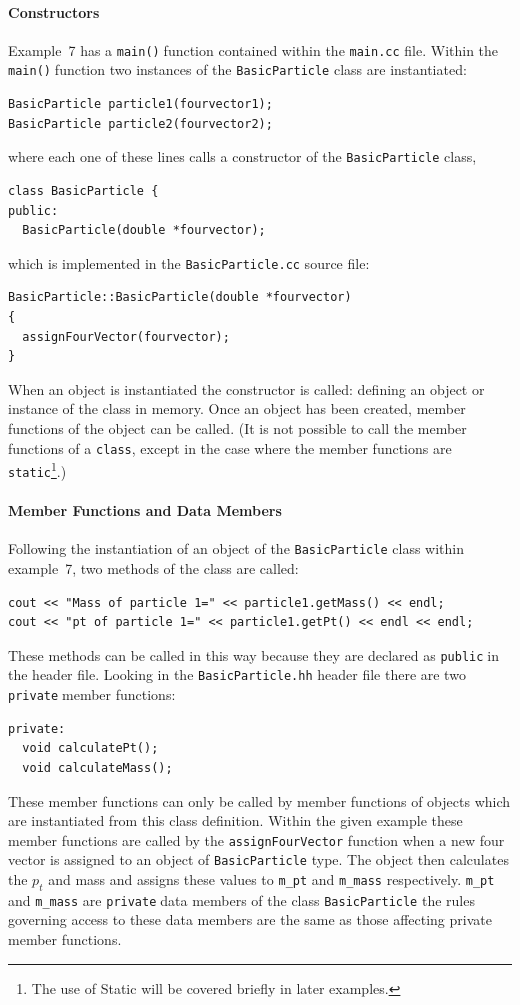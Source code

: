 \documentclass[11pt,a4paper]{scrartcl}
\def\main{\texttt{main()}$\;$}
\def\public{\texttt{public}$\;$}
\def\private{\texttt{private}$\;$}
\begin{document}
\paragraph{Constructors}
Example~7 has a \main function contained within the \texttt{main.cc}
file.  Within the \main function two instances of the \texttt{BasicParticle}
class are instantiated:
%
\begin{verbatim}
BasicParticle particle1(fourvector1);
BasicParticle particle2(fourvector2);
\end{verbatim}
%
where each one of these lines calls a constructor of the
\texttt{BasicParticle} class,
%
\begin{verbatim}
class BasicParticle {
public:
  BasicParticle(double *fourvector);
\end{verbatim}
%
which is implemented in the \texttt{BasicParticle.cc} source file:
%
\begin{verbatim}
BasicParticle::BasicParticle(double *fourvector)
{
  assignFourVector(fourvector);
}
\end{verbatim}
%
When an object is instantiated the constructor is called: defining
an object or instance of the class in memory.  Once an object has been
created, member functions of the object can be called.  (It is not
possible to call the member functions of a \texttt{class}, except in
the case where the member functions are \texttt{static}\footnote{The
use of Static will be covered briefly in later examples.}.)

\paragraph{Member Functions and Data Members}
Following the instantiation of an object of the \texttt{BasicParticle}
class within example~7, two methods of the class are called:
%
\begin{verbatim}
cout << "Mass of particle 1=" << particle1.getMass() << endl;
cout << "pt of particle 1=" << particle1.getPt() << endl << endl;
\end{verbatim}
%
These methods can be called in this way because they are declared as
\public in the header file.  Looking in the \texttt{BasicParticle.hh}
header file there are two \private member functions:
%
\begin{verbatim}
private:
  void calculatePt();
  void calculateMass();
\end{verbatim}
%
These member functions can only be called by member functions of
objects which are instantiated from this class
definition.  Within the given example these member functions are called by the
\texttt{assignFourVector} function when a new four vector is assigned to
an object of \texttt{BasicParticle} type.  The object then calculates
the $p_t$ and mass and assigns these values to \texttt{m\_pt} and
\texttt{m\_mass} respectively.  \texttt{m\_pt} and \texttt{m\_mass} are
\private data members of the class \texttt{BasicParticle} the rules
governing access to these data members are the same as those affecting
private member functions.
\end{document}
